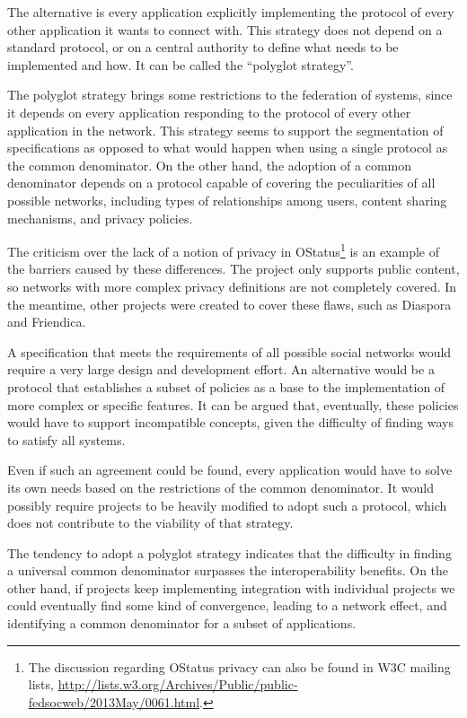 The alternative is every application explicitly implementing the
protocol of every other application it wants to connect with. This
strategy does not depend on a standard protocol, or on a central
authority to define what needs to be implemented and how. It can be
called the ``polyglot strategy''.

The polyglot strategy brings some restrictions to the federation of
systems, since it depends on every application responding to the
protocol of every other application in the network. This strategy seems
to support the segmentation of specifications as opposed to what would
happen when using a single protocol as the common denominator.  On the
other hand, the adoption of a common denominator depends on a protocol
capable of covering the peculiarities of all possible networks, including
types of relationships among users, content sharing mechanisms, and
privacy policies.

The criticism over the lack of a notion of privacy in
OStatus\footnote{The discussion regarding OStatus privacy can also be
found in W3C mailing lists,
\url{http://lists.w3.org/Archives/Public/public-fedsocweb/2013May/0061.html}.}
is an example of the barriers caused by these differences. The project
only supports public content, so networks with more complex privacy
definitions are not completely covered. In the meantime, other projects were
created to cover these flaws, such as Diaspora and Friendica.

A specification that meets the requirements of all possible social
networks would require a very large design and development effort. An
alternative would be a protocol that establishes a subset of policies as
a base to the implementation of more complex or specific features. It
can be argued that, eventually, these policies would have to support
incompatible concepts, given the difficulty of finding ways to satisfy
all systems.

Even if such an agreement could be found, every application would have to solve
its own needs based on the restrictions of the common denominator. It would
possibly require projects to be heavily modified to adopt such a protocol,
which does not contribute to the viability of that strategy.

The tendency to adopt a polyglot strategy indicates that the difficulty
in finding a universal common denominator surpasses the interoperability
benefits. On the other hand, if projects keep implementing integration
with individual projects we could eventually find some kind of
convergence, leading to a network effect, and identifying a common
denominator for a subset of applications.

